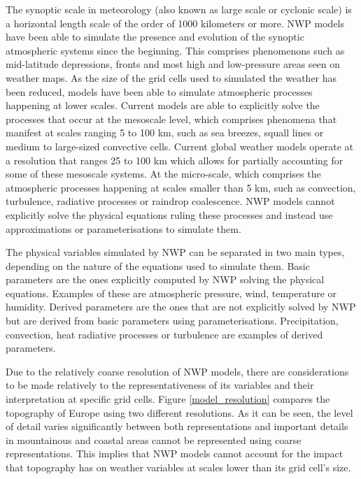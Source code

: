 The synoptic scale in meteorology (also known as large scale or cyclonic scale) is a horizontal length scale of the order of 1000 kilometers or more. NWP models have been able to simulate the presence and evolution of the synoptic atmospheric systems since the beginning. This comprises phenomenons such as mid-latitude depressions, fronts and most high and low-pressure areas seen on weather maps. As the size of the grid cells used to simulated the weather has been reduced, models have been able to simulate atmospheric processes happening at lower scales. Current models are able to explicitly solve the processes that occur at the mesoscale level, which comprises phenomena that manifest at scales ranging 5 to 100 km, such as sea breezes, squall lines or medium to large-sized convective cells. Current global weather models operate at a resolution that ranges 25 to 100 km which allows for partially accounting for some of these mesoscale systems. At the micro-scale, which comprises the atmospheric processes happening at scales smaller than 5 km, such as convection, turbulence, radiative processes or raindrop coalescence. NWP models cannot explicitly solve the physical equations ruling these processes and instead use approximations or parameterisations to simulate them.

\medskip

The physical variables simulated by NWP can be separated in two main types, depending on the nature of the equations used to simulate them. Basic parameters are the ones explicitly computed by NWP solving the physical equations. Examples of these are atmospheric pressure, wind, temperature or humidity. Derived parameters are the ones that are not explicitly solved by NWP but are derived from basic parameters using parameterisations. Precipitation, convection, heat radiative processes or turbulence are examples of derived parameters. 

\medskip

Due to the relatively coarse resolution of NWP models, there are considerations to be made relatively to the representativeness of its variables and their interpretation at specific grid cells. Figure \ref{model_resolution} compares the topography of Europe using two different resolutions. As it can be seen, the level of detail varies significantly between both representations and important details in mountainous and coastal areas cannot be represented using coarse representations. This implies that NWP models cannot account for the impact that topography has on weather variables at scales lower than its grid cell's size. 

